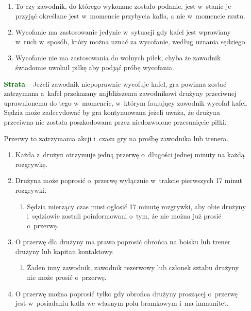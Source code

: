 \documentclass[12pt,a4paper]{article}
\renewcommand{\subsubsection}[1]{
  \oldsubsubsection{#1}%
  \leftskip1.5cm
}
\renewcommand{\paragraph}[1]{
  \oldparagraph{#1}%
  \leftskip2.8cm
}
\newcommand\other[1]{\bgroup\textcolor{darkgreen}{\textbf{#1}}}
\begin{document}
\begin{enumerate}
	\item
		To czy zawodnik, do którego wykonane zostało podanie,
		jest w~stanie je przyjąć określane jest w~momencie przybycia kafla, a
	      nie w~momencie rzutu.
	\item
	      Wycofanie ma zastosowanie jedynie w~sytuacji gdy kafel jest wprawiany
	      w~ruch w~sposób, który można uznać za wycofanie, według uznania
	      sędziego.
	\item
	      Wycofanie nie ma zastosowania do wolnych piłek, chyba że zawodnik
	      świadomie uwolnił piłkę aby podjąć próbę wycofania.
\end{enumerate}

\other{Strata} -- Jeżeli zawodnik niepoprawnie wycofuje kafel, gra powinna
zostać zatrzymana a~kafel przekazany najbliższemu zawodnikowi drużyny
przeciwnej uprawnionemu do tego w~momencie, w~którym faulujący zawodnik
wycofał kafel. Sędzia może zadecydować by gra kontynuowana jeżeli uważa,
że drużyna przeciwna nie została poszkodowana przez niedozwolone
przesunięcie piłki.

\subsubsection{Przerwy}

Przerwy to zatrzymania akcji i~czasu gry na prośbę zawodnika lub trenera.

\paragraph{Zgłaszanie przerw:}

\begin{enumerate}
	\item
	      Każda z~drużyn otrzymuje jedną przerwę o~długości jednej minuty na
	      każdą rozgrywkę.
	\item
	      Drużyna może poprosić o~przerwę wyłącznie w~trakcie pierwszych 17
	      minut rozgrywki.

	      \begin{enumerate}
		      \item
		            Sędzia mierzący czas musi ogłosić 17 minutę rozgrywki, aby obie
		            drużyny i~sędziowie zostali poinformowani o~tym, że nie można już
		            prosić o~przerwę.
	      \end{enumerate}
	\item
	      O przerwę dla drużyny ma prawo poprosić obrońca na boisku lub trener
	      drużyny lub kapitan kontaktowy.

	      \begin{enumerate}
		      \item
		            Żaden inny zawodnik, zawodnik rezerwowy lub członek sztabu drużyny
		            nie może prosić o~przerwę.
	      \end{enumerate}
	\item
	      O przerwę można poprosić tylko gdy obrońca drużyny proszącej o~przerwę
	      jest w~posiadaniu kafla we własnym polu bramkowym i~ma immunitet.
\end{enumerate}
\end{document}
